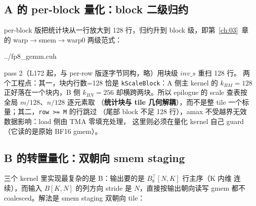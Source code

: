 \subsection{A 的 per-block 量化：block 二级归约}

per-block 版把统计块从一行放大到 128 行，归约升到 block 级，即第~\ref{ch:03}~章
的 warp$\to$smem$\to$warp0 两级范式：

\begin{lstinputlisting}[linerange={131-170},firstnumber=auto,
  title={fp8\_gemm.cuh L131-170（quantize\_a\_perblock\_kernel：128 行块 amax 两级归约）}]{../fp8_gemm.cuh}
\end{lstinputlisting}

pass 2（L172 起，与 per-row 版逐字节同构，略）用块级 $inv\_s$ 重扫 128 行。
两个工程点：其一，块内行数=128 恰是 \texttt{kScaleBlock}：A 侧主 kernel 的
$k_{BM}{=}128$ 正好落在一个块内，B 侧 $k_{BN}{=}256$ 却横跨两块。所以
epilogue 的 scale 查表按全局 $m/128$、$n/128$ 逐元素取
（\textbf{统计块与 tile 几何解耦}），而不是整 tile 一个标量；其二，\texttt{row >= M} 的行跳过
（尾部 block 不足 128 行），amax 不受越界无效数据影响：load 侧由 TMA 零填充处理，
这里则必须在量化 kernel 自己 guard（它读的是原始 BF16 gmem）。

\subsection{B 的转置量化：双朝向 smem staging}\label{sec:34-bt}

三个 kernel 里实现最复杂的是 B：输出要的是 $B_8^{\top}[N,K]$ 行主序（K 内维
连续），而输入 $B[K,N]$ 的列方向 stride 是 $N$，直接按输出朝向读写
gmem 都不 coalesced。解法是 smem staging 双朝向 tile：

